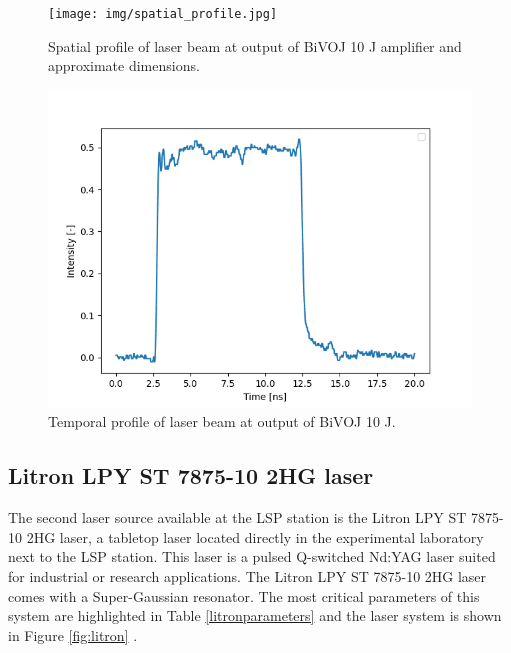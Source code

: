 \begin{figure}[h]
    \centering
    \texttt{[image: img/spatial\_profile.jpg]}
    \caption{Spatial profile of laser beam at output of BiVOJ 10 J amplifier and approximate dimensions.}
    \label{fig:spatialprofile}
\end{figure}

\begin{figure}[h]
    \centering
    \includegraphics[width=0.6\linewidth]{img/temporal_profile_bivoj.png}
    \caption{Temporal profile of laser beam at output of BiVOJ 10 J.}
    \label{fig:temporalprofile}
\end{figure}

\subsection{Litron LPY ST 7875-10 2HG laser}

The second laser source available at the LSP station is the Litron LPY ST 7875-10 2HG laser, a tabletop laser located directly in the experimental laboratory next to the LSP station. This laser is a pulsed Q-switched Nd:YAG laser suited for industrial or research applications. The Litron  LPY ST 7875-10 2HG laser comes with a Super-Gaussian resonator. The most critical parameters of this system are highlighted in Table \ref{litronparameters} and the laser system is shown in Figure \ref{fig:litron} \cite{litron}. 


